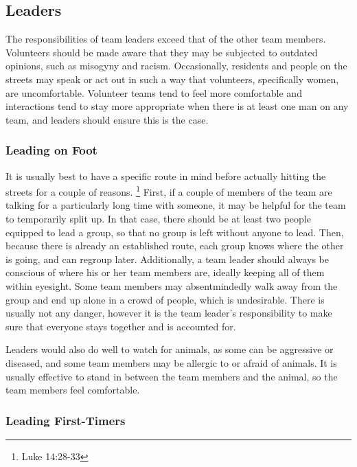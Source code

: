 \documentclass[12pt]{article}
\begin{document}
\subsection{Leaders}

    The responsibilities of team leaders exceed that of the other team members.
    Volunteers should be made aware that they may be subjected to outdated opinions, such as misogyny and racism.
    Occasionally, residents and people on the streets may speak or act out in such a way that volunteers, specifically women, are uncomfortable.
    Volunteer teams tend to feel more comfortable and interactions tend to stay more appropriate when there is at least one man on any team, and leaders should ensure this is the case.

\subsubsection{Leading on Foot}

    \qLeaders
    It is usually best to have a specific route in mind before actually hitting the streets for a couple of reasons.
    \footnote{Luke 14:28-33}
    First, if a couple of members of the team are talking for a particularly long time with someone, it may be helpful for the team to temporarily split up.
    In that case, there should be at least two people equipped to lead a group, so that no group is left without anyone to lead.
    Then, because there is already an established route, each group knows where the other is going, and can regroup later.
    Additionally, a team leader should always be conscious of where his or her team members are, ideally keeping all of them within eyesight.
    Some team members may absentmindedly walk away from the group and end up alone in a crowd of people, which is undesirable.
    There is usually not any danger, however it is the team leader's responsibility to make sure that everyone stays together and is accounted for.
    \par Leaders would also do well to watch for animals, as some can be aggressive or diseased, and some team members may be allergic to or afraid of animals.
    It is usually effective to stand in between the team members and the animal, so the team members feel comfortable.

\subsubsection{Leading First-Timers}
\end{document}
